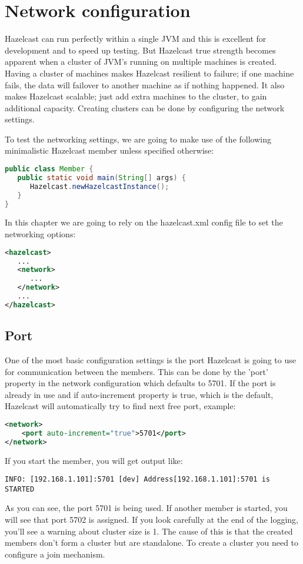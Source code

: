 \chapter{Network configuration}

Hazelcast can run perfectly within a single JVM and this is excellent for development and to speed up testing. But Hazelcast true strength becomes apparent when a cluster of JVM's running on multiple machines is created. Having a cluster of machines makes Hazelcast resilient to failure; if one machine fails, the data will failover to another machine as if nothing happened. It also makes Hazelcast scalable; just add extra machines to the cluster, to gain additional capacity. Creating clusters can be done by configuring the network settings.

To test the networking settings, we are going to make use of the following minimalistic Hazelcast member unless specified otherwise:
\begin{lstlisting}[language=java]
public class Member {
   public static void main(String[] args) {
      Hazelcast.newHazelcastInstance();
   }
}
\end{lstlisting}
In this chapter we are going to rely on the hazelcast.xml config file to set the networking options:
\begin{lstlisting}[language=xml]
<hazelcast>
   ...
   <network>
      ...  
   </network>
   ...
</hazelcast>
\end{lstlisting}

\section{Port}
One of the most basic configuration settings is the port Hazelcast is going to use for communication between the members. This can be done by the 'port' property in the network configuration which defaults to 5701. If the port is already in use and if auto-increment property is true, which is the default, Hazelcast will automatically try to find next free port, example:
\begin{lstlisting}[language=xml]
<network>
    <port auto-increment="true">5701</port>
</network>
\end{lstlisting}
If you start the member, you will get output like:
\begin{lstlisting}
INFO: [192.168.1.101]:5701 [dev] Address[192.168.1.101]:5701 is STARTED
\end{lstlisting}
As you can see, the port 5701 is being used. If another member is started, you will see that port 5702 is assigned. If you look carefully at the end of the logging, you'll see a warning about cluster size is 1. The cause of this is that the created members don't form a cluster but are standalone. To create a cluster you need to configure a join mechanism.

